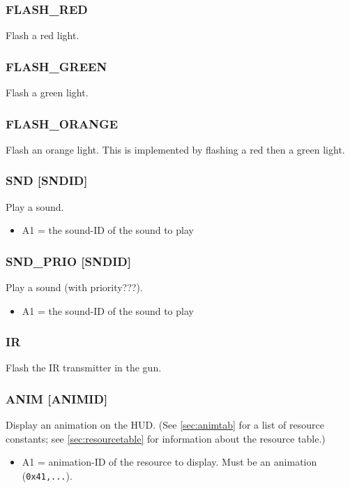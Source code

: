 \documentclass[12pt,a4paper]{scrbook}
\begin{document}
\subsubsection{FLASH\_RED}
Flash a red light.

\subsubsection{FLASH\_GREEN}
Flash a green light.

\subsubsection{FLASH\_ORANGE}
Flash an orange light.  This is implemented by flashing a red then a green light.


\subsubsection{SND [SNDID]}
Play a sound.
\begin{itemize}
\item A1 = the sound-ID of the sound to play 
\end{itemize}

\subsubsection{SND\_PRIO [SNDID]}
Play a sound (with priority???).
\begin{itemize}
\item A1 = the sound-ID of the sound to play
\end{itemize}

\subsubsection{IR}
Flash the IR transmitter in the gun.

\subsubsection{ANIM [ANIMID]}
Display an animation on the HUD.  (See \ref{sec:animtab} for a list of resource constants;
see \ref{sec:resourcetable} for information about the resource table.)
\begin{itemize}
\item A1 = animation-ID of the resource to display.  Must be an animation (\texttt{0x41,...}).
\end{itemize}
\end{document}
